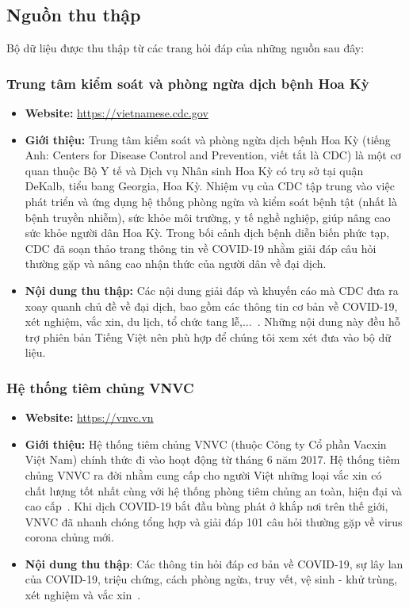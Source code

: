 \documentclass[runningheads]{llncs}
\begin{document}
\subsection{Nguồn thu thập}
Bộ dữ liệu được thu thập từ các trang hỏi đáp của những nguồn sau đây:

\subsubsection{Trung tâm kiểm soát và phòng ngừa dịch bệnh Hoa Kỳ}
\begin{itemize}
\item \textbf{Website:} \url{https://vietnamese.cdc.gov}
\item \textbf{Giới thiệu:}
Trung tâm kiểm soát và phòng ngừa dịch bệnh Hoa Kỳ (tiếng Anh: Centers for Disease Control and Prevention, viết tắt là CDC) là một cơ quan thuộc Bộ Y tế và Dịch vụ Nhân sinh Hoa Kỳ có trụ sở tại quận DeKalb, tiểu bang Georgia, Hoa Kỳ. Nhiệm vụ của CDC tập trung vào việc phát triển và ứng dụng hệ thống phòng ngừa và kiểm soát bệnh tật (nhất là bệnh truyền nhiễm), sức khỏe môi trường, y tế nghề nghiệp, giúp nâng cao sức khỏe người dân Hoa Kỳ. Trong bối cảnh dịch bệnh diễn biến phức tạp, CDC đã soạn thảo trang thông tin về COVID-19 nhằm giải đáp câu hỏi thường gặp và nâng cao nhận thức của người dân về đại dịch. 

\item \textbf{Nội dung thu thập:} Các nội dung giải đáp và khuyến cáo mà CDC đưa ra xoay quanh chủ đề về đại dịch, bao gồm các thông tin cơ bản về COVID-19, xét nghiệm, vắc xin, du lịch, tổ chức tang lễ,...~\cite{ref_url7}. Những nội dung này đều hỗ trợ phiên bản Tiếng Việt nên phù hợp để chúng tôi xem xét đưa vào bộ dữ liệu.
\end{itemize}

\subsubsection{Hệ thống tiêm chủng VNVC}
\begin{itemize}
\item \textbf{Website:} \url{https://vnvc.vn}
\item \textbf{Giới thiệu:}
Hệ thống tiêm chủng VNVC (thuộc Công ty Cổ phần Vacxin Việt Nam) chính thức đi vào hoạt động từ tháng 6 năm 2017. Hệ thống tiêm chủng VNVC ra đời nhằm cung cấp cho người Việt những loại vắc xin có chất lượng tốt nhất cùng với hệ thống phòng tiêm chủng an toàn, hiện đại và cao cấp~\cite{ref_url2}. Khi dịch COVID-19 bắt đầu bùng phát ở khắp nơi trên thế giới, VNVC đã nhanh chóng tổng hợp và giải đáp 101 câu hỏi thường gặp về virus corona chủng mới.

\item \textbf{Nội dung thu thập}: Các thông tin hỏi đáp cơ bản về COVID-19, sự lây lan của COVID-19, triệu chứng, cách phòng ngừa, truy vết, vệ sinh - khử trùng, xét nghiệm và vắc xin~\cite{ref_url8}.

\end{itemize}
\end{document}

